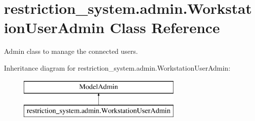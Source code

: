 \hypertarget{classrestriction__system_1_1admin_1_1WorkstationUserAdmin}{}\section{restriction\+\_\+system.\+admin.\+Workstation\+User\+Admin Class Reference}
\label{classrestriction__system_1_1admin_1_1WorkstationUserAdmin}


Admin class to manage the connected users.  


Inheritance diagram for restriction\+\_\+system.\+admin.\+Workstation\+User\+Admin\+:\begin{figure}[H]
\begin{center}
\leavevmode
\includegraphics[height=2.000000cm]{classrestriction__system_1_1admin_1_1WorkstationUserAdmin}
\end{center}
\end{figure}
